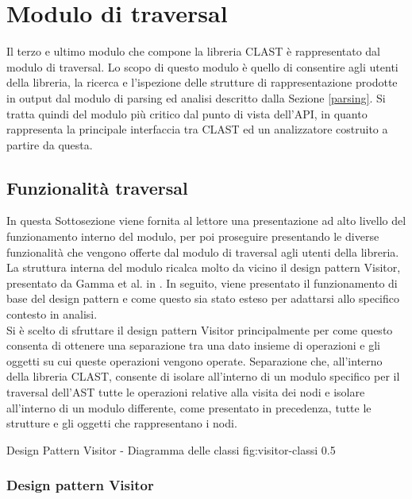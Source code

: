 \section{Modulo di traversal}

Il terzo e ultimo modulo che compone la libreria CLAST è rappresentato dal
modulo di traversal. Lo scopo di questo modulo è quello di consentire agli
utenti della libreria, la ricerca e l'ispezione delle strutture di
rappresentazione prodotte in output dal modulo di parsing ed analisi descritto
dalla Sezione \ref{parsing}. Si tratta quindi del modulo più critico dal punto
di vista dell'API, in quanto rappresenta la principale interfaccia tra CLAST ed
un analizzatore costruito a partire da questa.

\subsection{Funzionalità traversal}

In questa Sottosezione viene fornita al lettore una presentazione ad alto livello
del funzionamento interno del modulo, per poi proseguire presentando le
diverse funzionalità che vengono offerte dal modulo di traversal agli utenti
della libreria.\\

La struttura interna del modulo ricalca molto da vicino il design pattern
Visitor, presentato da Gamma et al. in \cite{gamma1995design}. In seguito, viene
presentato il funzionamento di base del design pattern e come questo sia stato
esteso per adattarsi allo specifico contesto in analisi.\\

Si è scelto di sfruttare il design pattern Visitor principalmente per come
questo consenta di ottenere una separazione tra una dato insieme di operazioni
e gli oggetti su cui queste operazioni vengono operate. Separazione che,
all'interno della libreria CLAST, consente di isolare all'interno di un modulo
specifico per il traversal dell'AST tutte le operazioni relative alla visita
dei nodi e isolare all'interno di un modulo differente, come presentato in
precedenza, tutte le strutture e gli oggetti che rappresentano i nodi.

      {Design Pattern Visitor - Diagramma delle classi}
      {fig:visitor-classi}
      {0.5}

\subsubsection{Design pattern Visitor}

